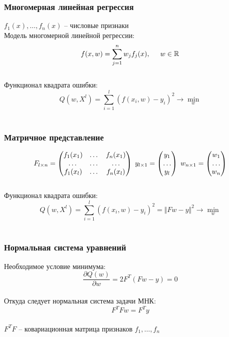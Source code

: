 \documentclass[10pt]{beamer}
\begin{document}
\begin{frame}\frametitle{Многомерная линейная регрессия}
	$f_1(x), \dots, f_n(x)$ -- числовые признаки\\
	Модель многомерной линейной регрессии:\\
	$$f (x, w) = \sum\limits_{j=1}^n w_j f_j(x), \hspace{5mm} w \in \mathbb{R}$$\\
	\bigbreak
	Функционал квадрата ошибки:\\
	$$Q(w,X^l) = \sum\limits_{i=1}^l (f (x_i, w) - y_i)^2  \rightarrow \min\limits_{w}$$\\
\end{frame}

\begin{frame}\frametitle{Матричное представление}
	$$F_{l \times n} = \begin{pmatrix}
	  f_1(x_1) & \dots & f_n(x_1) \\
	  \dots & \dots & \dots\\
	  f_1(x_l) & \dots & f_n(x_l)
	 \end{pmatrix} \hspace{1mm} y_{l \times 1} = \begin{pmatrix}
	  y_1 \\
	  \dots\\
	  y_l
	 \end{pmatrix} \hspace{1mm} w_{n \times 1} = \begin{pmatrix}
	  w_1 \\
	  \dots\\
	  w_n
	 \end{pmatrix}$$ \\
	\bigbreak
	Функционал квадрата ошибки:\\
	$$Q(w,X^l) = \sum\limits_{i=1}^l (f (x_i, w) - y_i)^2  = \Vert Fw - y \Vert^2 \rightarrow \min\limits_{w}$$\\
\end{frame}

\begin{frame}\frametitle{Нормальная система уравнений}
	Необходимое условие минимума:\\
	$$\frac{\partial Q(w)}{\partial w}  = 2 F^T(F w - y) = 0$$\\
	Откуда следует нормальная система задачи МНК:\\
	$$F^TFw = F^Ty$$\\
	$F^TF$ -- ковариационная матрица признаков $f_1, \dots, f_n$\\
\end{frame}
\end{document}
